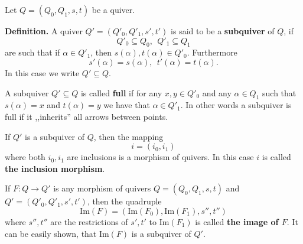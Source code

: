\documentclass[12pt]{article}
\begin{document}
Let $Q=(Q_0,Q_1,s,t)$ be a quiver.

\textbf{Definition.} A quiver $Q'=(Q'_0, Q'_1, s',t')$ is said to be a \textbf{subquiver} of $Q$, if
$$Q'_0\subseteq Q_0,\ \ Q'_1\subseteq Q_1$$
are such that if $\alpha\in Q'_1$, then $s(\alpha),t(\alpha)\in Q'_0$. Furthermore
$$s'(\alpha)=s(\alpha),\ \ t'(\alpha)=t(\alpha).$$
In this case we write $Q'\subseteq Q$.

A subquiver $Q'\subseteq Q$ is called \textbf{full} if for any $x,y\in Q'_0$ and any $\alpha\in Q_1$ such that $s(\alpha)=x$ and $t(\alpha)=y$ we have that $\alpha\in Q'_1$. In other words a subquiver is full if it ,,inherits'' all arrows between points.

If $Q'$ is a subquiver of $Q$, then the mapping
$$i=(i_0,i_1)$$
where both $i_0, i_1$ are inclusions is a morphism of quivers. In this case $i$ is called \textbf{the inclusion morphism}.

If $F:Q\to Q'$ is any morphism of quivers $Q=(Q_0,Q_1,s,t)$ and $Q'=(Q'_0, Q'_1,s',t')$, then the quadruple
$$\mathrm{Im}(F)=(\mathrm{Im}(F_0), \mathrm{Im}(F_1), s'', t'')$$
where $s'', t''$ are the restrictions of $s',t'$ to $\mathrm{Im}(F_1)$ is called \textbf{the image of $F$}. It can be easily shown, that $\mathrm{Im}(F)$ is a subquiver of $Q'$.
\end{document}
